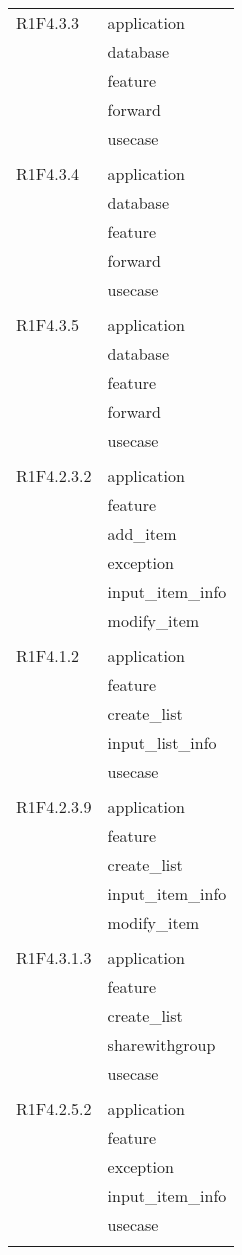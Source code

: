 \begin{center}
\begin{longtable}{|p{7cm}|p{7cm}|}
		R1F4.3.3 & application \\ & database \\ & feature \\ & forward \\ & usecase \\ & \\ \hline
		R1F4.3.4 & application \\ & database \\ & feature \\ & forward \\ & usecase \\ & \\ \hline
		R1F4.3.5 & application \\ & database \\ & feature \\ & forward \\ & usecase \\ & \\ \hline
		R1F4.2.3.2 & application \\ & feature \\ & add\_item \\ & exception \\ & input\_item\_info \\ & modify\_item \\ & \\ \hline
		R1F4.1.2 & application \\ & feature \\ & create\_list \\ & input\_list\_info \\ & usecase \\ & \\ \hline
		R1F4.2.3.9 & application \\ & feature \\ & create\_list \\ & input\_item\_info \\ & modify\_item \\ & \\ \hline
		R1F4.3.1.3 & application \\ & feature \\ & create\_list \\ & sharewithgroup \\ & usecase \\ & \\ \hline
		R1F4.2.5.2 & application \\ & feature \\ & exception \\ & input\_item\_info \\ & usecase \\ & \\ \hline

\end{longtable}
\end{center}
